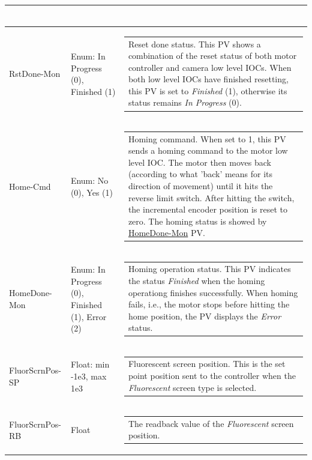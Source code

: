 \documentclass[openany]{article}
\begin{document}
\begin{longtable}{| m{4.5cm} m{2.5cm}  m{7.0cm} |}
\begin{tabular}{@{}m{6cm}@{}}
            \end{tabular} \hypertarget{pv:rst-done-mon}{}\\ \hline
        RstDone-Mon & Enum: In Progress (0), Finished (1) & \begin{tabular}{@{}m{6cm}@{}}
                Reset done status. This PV shows a combination of the reset status of both motor controller and camera low level IOCs. When both low level IOCs have finished resetting, this PV is set to \emph{Finished} (1), otherwise its status remains \emph{In Progress} (0).
            \end{tabular} \hypertarget{pv:home-cmd}{}\\ \hline
        Home-Cmd & Enum: No (0), Yes (1) & \begin{tabular}{@{}m{6cm}@{}}
                Homing command. When set to 1, this PV sends a homing command to the motor low level IOC. The motor then moves back (according to what 'back' means for its direction of movement) until it hits the reverse limit switch. After hitting the switch, the incremental encoder position is reset to zero. The homing status is showed by \hyperlink{pv:home-done-mon}{HomeDone-Mon} PV.
            \end{tabular} \hypertarget{pv:home-done-mon}{}\\ \hline
        HomeDone-Mon & Enum: In Progress (0), Finished (1), Error (2) & \begin{tabular}{@{}m{6cm}@{}}
                Homing operation status. This PV indicates the status \emph{Finished} when the homing operationg finishes successfully. When homing fails, i.e., the motor stops before hitting the home position, the PV displays the \emph{Error} status.
            \end{tabular} \hypertarget{pv:fluor-scrn-pos}{}\\ \hline
        FluorScrnPos-SP & Float: min -1e3, max 1e3 & \begin{tabular}{@{}m{6cm}@{}}
                Fluorescent screen position. This is the set point position sent to the controller when the \emph{Fluorescent} screen type is selected.
            \end{tabular} \hypertarget{}{}\\ \hline
        FluorScrnPos-RB & Float & \begin{tabular}{@{}m{6cm}@{}}
                The readback value of the \emph{Fluorescent} screen position.
            \end{tabular} \hypertarget{pv:get-fluor-scrn-pos-cmd}{}\\ \hline

\end{longtable}
\end{document}
